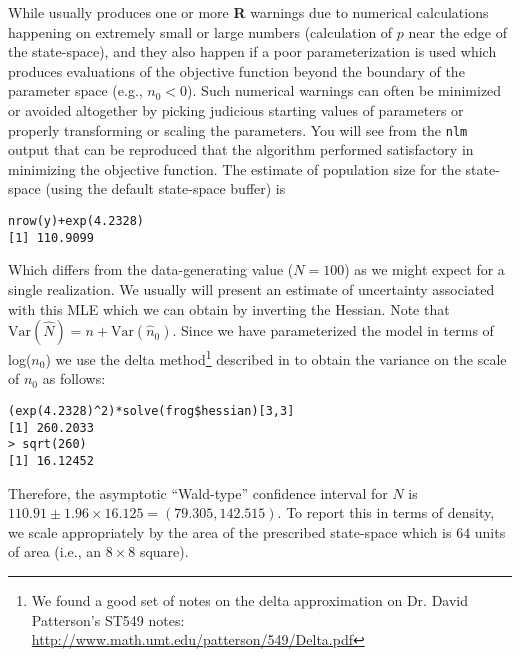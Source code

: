 While usually produces one or more {\bf R} warnings due to numerical
calculations happening on extremely small or large numbers
(calculation of $p$ near the
edge of the state-space), and they also happen if a poor
parameterization is used which produces evaluations of the objective
function beyond the boundary of the parameter space (e.g., $n_{0} <
0$). Such numerical warnings can often be minimized or avoided
altogether by picking judicious starting values of parameters or
properly transforming or scaling the parameters.
You will see from the \mbox{\tt nlm} output that can be reproduced that the
algorithm performed satisfactory in minimizing the objective function.
The estimate of population size for the state-space (using the default 
state-space buffer) is
\begin{verbatim}
nrow(y)+exp(4.2328)
[1] 110.9099
\end{verbatim}
Which differs from the data-generating value ($N=100$) as we might
expect for a single realization. We usually will present an estimate of uncertainty associated
with this MLE which we can obtain by inverting the Hessian. Note that
$\mbox{Var}(\hat{N}) = n + \mbox{Var}(\hat{n}_{0})$.
Since we
have parameterized the model in terms of log($n_{0}$) we use the delta
method\footnote{
We found a good set of notes on the delta approximation on Dr. David
Patterson's ST549 notes: 
\url{http://www.math.umt.edu/patterson/549/Delta.pdf}
}
described in 
\citet[][Appendix F4]{williams_etal:2002}  \citep[see also][]{verhoef:2012}
 to obtain the variance on the scale of $n_{0}$ as
follows:
\begin{verbatim}
(exp(4.2328)^2)*solve(frog$hessian)[3,3]
[1] 260.2033
> sqrt(260)
[1] 16.12452
\end{verbatim}
Therefore, the asymptotic ``Wald-type'' confidence interval for $N$ is
$110.91 \pm 1.96 \times 16.125 = (79.305, 142.515)$. To report this in
terms of density, we scale appropriately by the area of the prescribed
state-space which is $64$ units of area (i.e., an $8 \times 8$ square).


